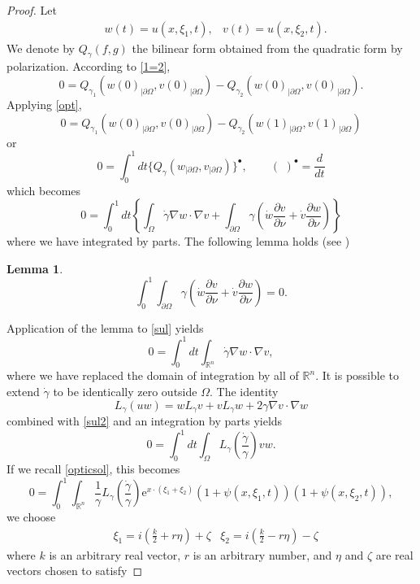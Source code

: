 \documentclass[10pt, a4paper, twoside, openright]{book}
\theoremstyle{definition}
\theoremstyle{plain}
\theoremstyle{plain}
\theoremstyle{plain}
\theoremstyle{plain}
\theoremstyle{plain}
\newtheorem{lemma}[subsection]{Lemma}
\theoremstyle{plain}
\theoremstyle{plain}
\theoremstyle{plain}
\begin{document}
\begin{proof}
Let
\begin{align*}
&w(t)=u(x,\xi_1,t),&v(t)=u(x,\xi_2,t).
\end{align*}
We denote by $Q_{\gamma}(f,g)$ the bilinear form obtained from the quadratic
form by polarization. According to \eqref{1=2},
$$0=Q_{\gamma_1}(w(0)_{|\partial\Omega},v(0)_{|\partial\Omega})-
Q_{\gamma_2}(w(0)_{|\partial\Omega},v(0)_{|\partial\Omega}).$$
Applying \eqref{opt},
$$0=Q_{\gamma_1}(w(0)_{|\partial\Omega},v(0)_{|\partial\Omega})-
Q_{\gamma_2}(w(1)_{|\partial\Omega},v(1)_{|\partial\Omega})$$
or
$$0=\int_0^1dt\{Q_{\gamma}(w_{|\partial\Omega},v_{|\partial\Omega})\}^{\bullet},
\qquad(\,\,)^{\bullet}=\frac{d}{dt}$$
which becomes
\begin{equation}
\label{sul}
0=\int_0^1dt\left\{\int_{\Omega}\dot{\gamma}\nabla w\cdot\nabla v
+\int_{\partial\Omega}\gamma\left(\dot{w}\frac{\partial v}{\partial\nu}+
\dot{v}\frac{\partial w}{\partial\nu}\right)\right\}
\end{equation}
where we have integrated by parts.
The following lemma holds (see \cite[Lemma 2.8]{Sy-Uh})
\begin{lemma}
\label{lemmasu}
$$\int_0^1\int_{\partial\Omega}\gamma\left(\dot{w}\frac{\partial v}{\partial\nu}+
\dot{v}\frac{\partial w}{\partial\nu}\right)=0.$$
\end{lemma}
Application of the lemma to \eqref{sul} yields
\begin{equation}
\label{sul2}
0=\int_0^1dt\int_{\mathbb{R}^n}\dot{\gamma}\nabla w\cdot\nabla v,
\end{equation}
where we have replaced the domain of integration by all of $\mathbb{R}^n$.
It is possible to extend $\dot{\gamma}$ to be identically zero outside
$\Omega$. The identity
$$L_{\gamma}(uw)=wL_{\gamma}v+vL_{\gamma}w
+2\gamma\nabla v\cdot\nabla w$$
combined with \eqref{sul2} and an integration by parts yields
$$0=\int_0^1dt\int_{\Omega}L_{\gamma}\left(
\frac{\dot{\gamma}}{\gamma}\right)vw.$$
If we recall \eqref{opticsol}, this becomes
\begin{equation}
\label{sul3}
0=\int_0^1\int_{\mathbb{R}^n}\frac{1}{\gamma}
L_{\gamma}\left(\frac{\dot{\gamma}}{\gamma}\right)
\mathrm{e}^{x\cdot(\xi_1+\xi_2)}(1+\psi(x,\xi_1,t))
(1+\psi(x,\xi_2,t)),
\end{equation}
we choose
\begin{align*}
&\xi_1=i\left(\frac{k}{2}+r\eta\right)+\zeta
&\xi_2=i\left(\frac{k}{2}-r\eta\right)-\zeta
\end{align*}
where $k$ is an arbitrary real vector, $r$ is an arbitrary number, and
$\eta$ and $\zeta$ are real vectors chosen to satisfy

\end{proof}
\end{document}
